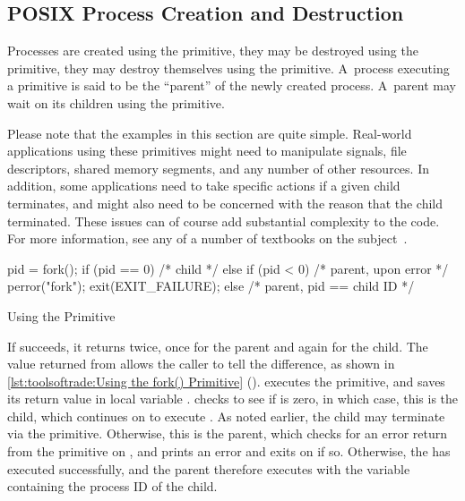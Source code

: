 \subsection{POSIX Process Creation and Destruction}
\label{sec:toolsoftrade:POSIX Process Creation and Destruction}

Processes are created using the  primitive, they may
be destroyed using the  primitive, they may destroy
themselves using the  primitive.
A~process executing a  primitive is said to be the ``parent''
of the newly created process.
A~parent may wait on its children using the  primitive.

Please note that the examples in this section are quite simple.
Real-world applications using these primitives might need to manipulate
signals, file descriptors, shared memory segments, and any number of
other resources.
In addition, some applications need to take specific actions if a given
child terminates, and might also need to be concerned with the reason
that the child terminated.
These issues can of course add substantial complexity to the code.
For more information, see any of a number of textbooks on the
subject~\cite{WRichardStevens1992,StewartWeiss2013UNIX}.

\begin{listing}
\begin{fcvlabel}
\begin{VerbatimL}[commandchars=\%\[\]]
pid = fork();%
if (pid == 0) {%
	/* child */%
} else if (pid < 0) {%
	/* parent, upon error */%
	perror("fork");
	exit(EXIT_FAILURE);%
} else {
	/* parent, pid == child ID */%
}
\end{VerbatimL}
\end{fcvlabel}
\caption{Using the  Primitive}
\label{lst:toolsoftrade:Using the fork() Primitive}
\end{listing}

\begin{fcvref}
If  succeeds, it returns twice, once for the parent
and again for the child.
The value returned from  allows the caller to tell
the difference, as shown in
\cref{lst:toolsoftrade:Using the fork() Primitive}
().
 executes the  primitive, and saves
its return value in local variable .
 checks to see if  is zero, in which case,
this is the child, which continues on to execute .
As noted earlier, the child may terminate via the  primitive.
Otherwise, this is the parent, which checks for an error return from
the  primitive on , and prints an error
and exits on  if so.
Otherwise, the  has executed successfully, and the parent
therefore executes  with the variable 
containing the process ID of the child.
\end{fcvref}

